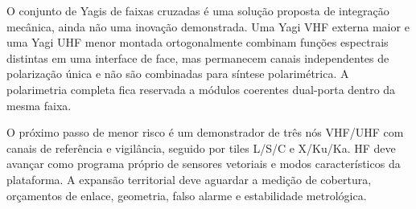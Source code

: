 O conjunto de Yagis de faixas cruzadas é uma solução proposta de integração mecânica, ainda não uma inovação demonstrada. Uma Yagi VHF externa maior e uma Yagi UHF menor montada ortogonalmente combinam funções espectrais distintas em uma interface de face, mas permanecem canais independentes de polarização única e não são combinadas para síntese polarimétrica. A polarimetria completa fica reservada a módulos coerentes dual-porta dentro da mesma faixa.

O próximo passo de menor risco é um demonstrador de três nós VHF/UHF com canais de referência e vigilância, seguido por tiles L/S/C e X/Ku/Ka. HF deve avançar como programa próprio de sensores vetoriais e modos característicos da plataforma. A expansão territorial deve aguardar a medição de cobertura, orçamentos de enlace, geometria, falso alarme e estabilidade metrológica.
